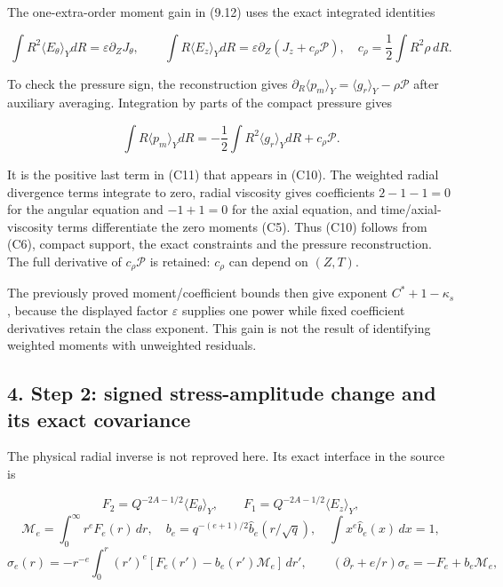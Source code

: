 \documentclass[10pt,a4paper]{article}
\begin{document}
The one-extra-order moment gain in (9.12) uses the exact integrated identities

\[
\int R^2\langle E_\theta\rangle_YdR=\varepsilon\partial_ZJ_\theta,
\qquad
\int R\langle E_z\rangle_YdR
=\varepsilon\partial_Z(J_z+c_\rho\mathcal P),
\quad c_\rho=\frac12\int R^2\rho\,dR.
\tag{C10}
\]

To check the pressure sign, the reconstruction gives \(\partial_R\langle p_m\rangle_Y=\langle g_r\rangle_Y-\rho\mathcal P\) after auxiliary averaging. Integration by parts of the compact pressure gives

\[
\int R\langle p_m\rangle_YdR
=-\frac12\int R^2\langle g_r\rangle_YdR+c_\rho\mathcal P.
\tag{C11}
\]

It is the positive last term in (C11) that appears in (C10). The weighted radial divergence terms integrate to zero, radial viscosity gives coefficients \(2-1-1=0\) for the angular equation and \(-1+1=0\) for the axial equation, and time/axial-viscosity terms differentiate the zero moments (C5). Thus (C10) follows from (C6), compact support, the exact constraints and the pressure reconstruction. The full derivative of \(c_\rho\mathcal P\) is retained: \(c_\rho\) can depend on \((Z,T)\).

The previously proved moment/coefficient bounds then give exponent \(C^*+1-\kappa_s\), because the displayed factor \(\varepsilon\) supplies one power while fixed coefficient derivatives retain the class exponent. This gain is not the result of identifying weighted moments with unweighted residuals.

\subsection{4. Step 2: signed stress-amplitude change and its exact covariance}\label{nsupstream:stage_cycle_gain_audit:step-2-signed-stress-amplitude-change-and-its-exact-covariance}

The physical radial inverse is not reproved here. Its exact interface in the source is

\[
F_2=Q^{-2A-1/2}\langle E_\theta\rangle_Y,
\qquad F_1=Q^{-2A-1/2}\langle E_z\rangle_Y,
\] \[
\mathcal M_e=\int_0^\infty r^eF_e(r)\,dr,
\quad b_e=q^{-(e+1)/2}\widehat b_e(r/\sqrt q),
\quad\int x^e\widehat b_e(x)\,dx=1,
\] \[
\sigma_e(r)=-r^{-e}\int_0^r(r')^e[F_e(r')-b_e(r')\mathcal M_e]\,dr',
\qquad(\partial_r+e/r)\sigma_e=-F_e+b_e\mathcal M_e,
\tag{C12}
\]
\end{document}

